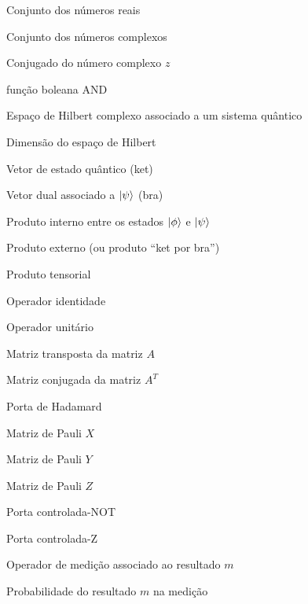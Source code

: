 \begin{simbolos}

  \item[$\mathbb{R}$] Conjunto dos números reais
  \item[$\mathbb{C}$] Conjunto dos números complexos
  
  \item[$z^*$] Conjugado do número complexo $z$
  
  \item[$\mathbb{\wedge}$] função boleana $\mathrm{AND}$

  \item[$\mathcal{H}$] Espaço de Hilbert complexo associado a um sistema quântico
  \item[$\dim(\mathcal{H})$] Dimensão do espaço de Hilbert

  \item[$\ket{\psi}$] Vetor de estado quântico (ket)
  \item[$\bra{\psi}$] Vetor dual associado a $\ket{\psi}$ (bra)
  \item[$\braket{\phi|\psi}$] Produto interno entre os estados $\ket{\phi}$ e $\ket{\psi}$
  \item[$\ket{\phi}\bra{\psi}$] Produto externo (ou produto ``ket por bra'')

  \item[$\otimes$] Produto tensorial
  
  \item[$I$] Operador identidade
  \item[$U$] Operador unitário
  
  \item[$A^T$] Matriz transposta da matriz $A$
  \item[$A^\dagger$] Matriz conjugada da matriz $A^T$

  \item[$H$] Porta de Hadamard
  \item[$X$] Matriz de Pauli $X$
  \item[$Y$] Matriz de Pauli $Y$
  \item[$Z$] Matriz de Pauli $Z$
  \item[$CX$] Porta controlada-NOT
  \item[$CZ$] Porta controlada-Z

  \item[$M_m$] Operador de medição associado ao resultado $m$
  \item[$p(m)$] Probabilidade do resultado $m$ na medição


\end{simbolos}
